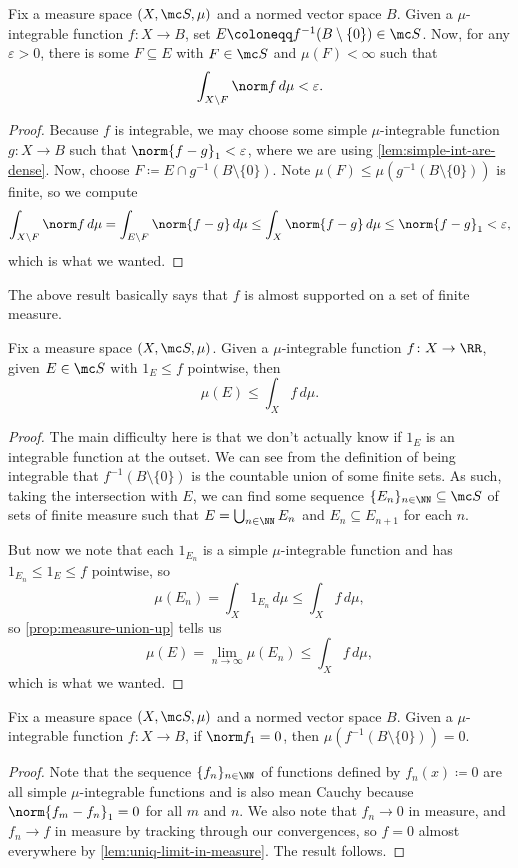 \documentclass[../notes.tex]{subfiles}
\begin{document}
\begin{lemma}
	Fix a measure space $(X,\mc S,\mu)$ and a normed vector space $B$. Given a $\mu$-integrable function $f\colon X\to B$, set $E\coloneqq f^{-1}(B\setminus\{0\})\in\mc S$. Now, for any $\varepsilon>0$, there is some $F\subseteq E$ with $F\in\mc S$ and $\mu(F)<\infty$ such that
	\[\int_{X\setminus F}\norm f\,d\mu<\varepsilon.\]
\end{lemma}
\begin{proof}
	Because $f$ is integrable, we may choose some simple $\mu$-integrable function $g\colon X\to B$ such that $\norm{f-g}_1<\varepsilon$, where we are using \autoref{lem:simple-int-are-dense}. Now, choose $F\coloneqq E\cap g^{-1}(B\setminus\{0\})$. Note $\mu(F)\le\mu\left(g^{-1}(B\setminus\{0\})\right)$ is finite, so we compute
	\[\int_{X\setminus F}\norm f\,d\mu=\int_{E\setminus F}\norm{f-g}\,d\mu\le\int_X\norm{f-g}\,d\mu\le\norm{f-g}_1<\varepsilon,\]
	which is what we wanted.
\end{proof}
\begin{remark}
	The above result basically says that $f$ is almost supported on a set of finite measure.
\end{remark}
\begin{lemma}
	Fix a measure space $(X,\mc S,\mu)$. Given a $\mu$-integrable function $f\colon X\to\RR$, given $E\in\mc S$ with $1_E\le f$ pointwise, then
	\[\mu(E)\le\int_Xf\,d\mu.\]
\end{lemma}
\begin{proof}
	The main difficulty here is that we don't actually know if $1_E$ is an integrable function at the outset. We can see from the definition of being integrable that $f^{-1}(B\setminus\{0\})$ is the countable union of some finite sets. As such, taking the intersection with $E$, we can find some sequence $\{E_n\}_{n\in\NN}\subseteq\mc S$ of sets of finite measure such that $E=\bigcup_{n\in\NN}E_n$ and $E_n\subseteq E_{n+1}$ for each $n$.

	But now we note that each $1_{E_n}$ is a simple $\mu$-integrable function and has $1_{E_n}\le1_E\le f$ pointwise, so
	\[\mu(E_n)=\int_X1_{E_n}\,d\mu\le\int_Xf\,d\mu,\]
	so \autoref{prop:measure-union-up} tells us
	\[\mu(E)=\lim_{n\to\infty}\mu(E_n)\le\int_Xf\,d\mu,\]
	which is what we wanted.
\end{proof}
\begin{lemma}
	Fix a measure space $(X,\mc S,\mu)$ and a normed vector space $B$. Given a $\mu$-integrable function $f\colon X\to B$, if $\norm f_1=0$, then $\mu\left(f^{-1}(B\setminus\{0\})\right)=0$.
\end{lemma}
\begin{proof}
	Note that the sequence $\{f_n\}_{n\in\NN}$ of functions defined by $f_n(x)\coloneqq0$ are all simple $\mu$-integrable functions and is also mean Cauchy because $\norm{f_m-f_n}_1=0$ for all $m$ and $n$. We also note that $f_n\to0$ in measure, and $f_n\to f$ in measure by tracking through our convergences, so $f=0$ almost everywhere by \autoref{lem:uniq-limit-in-measure}. The result follows.
\end{proof}
\end{document}
